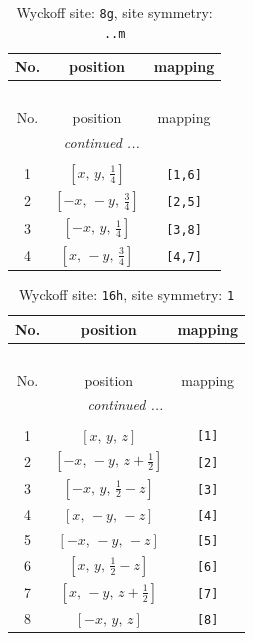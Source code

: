 \documentclass[fleqn,8pt]{jsarticle}
\begin{document}
\renewcommand{\arraystretch}{1.2}
\begin{longtable}{ccc}
\caption{Wyckoff site: {\tt 8g}, site symmetry: {\tt ..m}}
 \\
 \hline \hline
No. & position & mapping \\ \hline \endfirsthead

\multicolumn{2}{l}{\tablename\ \thetable{}} \\
 \hline \hline
No. & position & mapping \\ \hline \endhead

 \hline \hline
\multicolumn{2}{r}{\footnotesize\it continued ...} \\ \endfoot

 \hline \hline
\multicolumn{2}{r}{} \\ \endlastfoot

1 & $\left[ x,\, y,\, \frac{1}{4} \right]$ & {\tt [1,6]} \\ \hline
2 & $\left[ - x,\, - y,\, \frac{3}{4} \right]$ & {\tt [2,5]} \\ \hline
3 & $\left[ - x,\, y,\, \frac{1}{4} \right]$ & {\tt [3,8]} \\ \hline
4 & $\left[ x,\, - y,\, \frac{3}{4} \right]$ & {\tt [4,7]} \\
\end{longtable}
\renewcommand{\arraystretch}{1.2}
\begin{longtable}{ccc}
\caption{Wyckoff site: {\tt 16h}, site symmetry: {\tt 1}}
 \\
 \hline \hline
No. & position & mapping \\ \hline \endfirsthead

\multicolumn{2}{l}{\tablename\ \thetable{}} \\
 \hline \hline
No. & position & mapping \\ \hline \endhead

 \hline \hline
\multicolumn{2}{r}{\footnotesize\it continued ...} \\ \endfoot

 \hline \hline
\multicolumn{2}{r}{} \\ \endlastfoot

1 & $\left[ x,\, y,\, z \right]$ & {\tt [1]} \\ \hline
2 & $\left[ - x,\, - y,\, z + \frac{1}{2} \right]$ & {\tt [2]} \\ \hline
3 & $\left[ - x,\, y,\, \frac{1}{2} - z \right]$ & {\tt [3]} \\ \hline
4 & $\left[ x,\, - y,\, - z \right]$ & {\tt [4]} \\ \hline
5 & $\left[ - x,\, - y,\, - z \right]$ & {\tt [5]} \\ \hline
6 & $\left[ x,\, y,\, \frac{1}{2} - z \right]$ & {\tt [6]} \\ \hline
7 & $\left[ x,\, - y,\, z + \frac{1}{2} \right]$ & {\tt [7]} \\ \hline
8 & $\left[ - x,\, y,\, z \right]$ & {\tt [8]} \\
\end{longtable}
\end{document}
